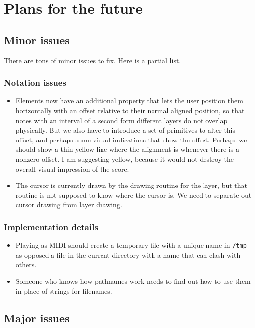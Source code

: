\chapter{Plans for the future}

\section{Minor issues}

There are tons of minor issues to fix.  Here is a partial list.

\subsection{Notation issues}

\begin{itemize}
\item Elements now have an additional property that lets the user
  position them horizontally with an offset relative to their normal
  aligned position, so that notes with an interval of a second form
  different layers do not overlap physically.  But we also have to
  introduce a set of primitives to alter this offset, and perhaps some
  visual indications that show the offset.  Perhaps we should show a
  thin yellow line where the alignment is whenever there is a nonzero
  offset.  I am suggesting yellow, because it would not destroy the
  overall visual impression of the score. 
\item The cursor is currently drawn by the drawing routine for the
  layer, but that routine is not supposed to know where the cursor
  is.  We need to separate out cursor drawing from layer drawing. 
\end{itemize}

\subsection{Implementation details}

\begin{itemize}
\item Playing as MIDI should create a temporary file with a unique
  name in \texttt{/tmp} as opposed a file in the current directory
  with a name that can clash with others. 
\item Someone who knows how pathnames work needs to find out how to
  use them in place of strings for filenames. 
\end{itemize}

\section{Major issues}

